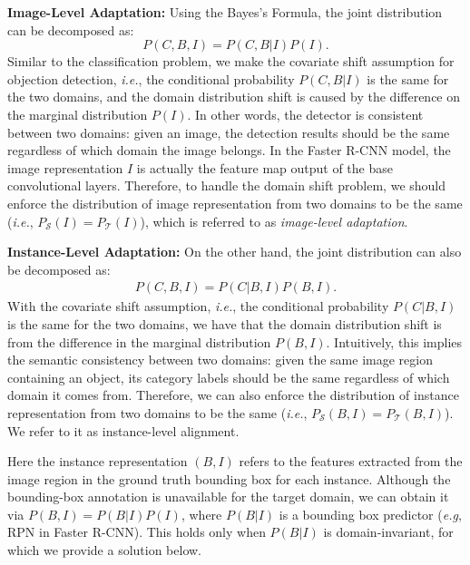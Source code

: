 \documentclass[10pt,twocolumn,letterpaper]{article}
\def\eg{\emph{e.g}}
\def\ie{\emph{i.e.}}
\def\cS{\mathcal{S}}
\def\cT{\mathcal{T}}
\begin{document}
\textbf{Image-Level Adaptation: } Using the Bayes's Formula, the joint distribution can be decomposed as:
\begin{equation}
P(C, B, I) = P(C, B |I)P(I).
\label{eqn:detection_image_level}
\end{equation}
Similar to the classification problem, we make the covariate shift assumption for objection detection, \ie, the conditional probability $P(C, B|I)$ is the same for the two domains, and the domain distribution shift is caused by the difference on the marginal distribution $P(I)$. In other words, the detector is consistent between two domains: given an image, the detection results should be the same regardless of which domain the image belongs. In the Faster R-CNN model, the image representation $I$ is actually the feature map output of the base convolutional layers. Therefore, to handle the domain shift problem, we should enforce the distribution of image representation from two domains to be the same (\ie,  $P_{\cS}(I) = P_{\cT}(I)$), which is referred to as \textit{image-level adaptation}. 

\textbf{Instance-Level Adaptation: } 
On the other hand, the joint distribution can also be decomposed as:
\begin{eqnarray}
P(C, B, I) = P(C|B, I)P(B, I).
\label{eqn:detection_roi_level}
\end{eqnarray}
With the covariate shift assumption, \ie, the conditional probability $P(C|B, I)$ is the same for the two domains, we have that the domain distribution shift is from the difference in the marginal distribution $P(B, I)$. Intuitively, this implies the semantic consistency between two domains: given the same image region containing an object, its category labels should be the same regardless of which domain it comes from. Therefore, we can also enforce the distribution of instance representation from two domains to be the same (\ie, $P_{\cS}(B, I) = P_{\cT}(B, I)$). We refer to it as instance-level alignment. 

Here the instance representation $(B, I)$ refers to the features extracted from the image region in the ground truth bounding box for each instance. Although the bounding-box annotation is unavailable for the target domain, we can obtain it via $P(B, I) = P(B|I)P(I)$, where $P(B|I)$ is a bounding box predictor (\eg, RPN in Faster R-CNN). This holds only when $P(B|I)$ is domain-invariant, for which we provide a solution below. 
\end{document}
